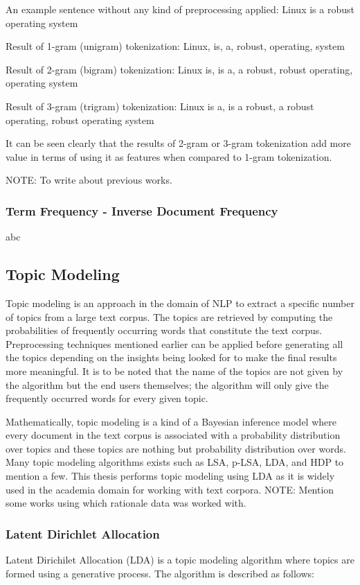 \documentclass[a4paper,12pt,twoside]{report}
\begin{document}
An example sentence without any kind of preprocessing applied: Linux is a robust operating system

Result of 1-gram (unigram) tokenization: Linux, is, a, robust, operating, system 

Result of 2-gram (bigram) tokenization: Linux is, is a, a robust, robust operating, operating system

Result of 3-gram (trigram) tokenization: Linux is a, is a robust, a robust operating, robust operating system

It can be seen clearly that the results of 2-gram or 3-gram tokenization add more value in terms of using it as features when compared to 1-gram tokenization.

NOTE: To write about previous works. 

\subsubsection{Term Frequency - Inverse Document Frequency}
abc

\subsection{Topic Modeling}
Topic modeling is an approach in the domain of NLP to extract a specific number of topics from a large text corpus. The topics are retrieved by computing the probabilities of frequently occurring words that constitute the text corpus. Preprocessing techniques mentioned earlier can be applied before generating all the topics depending on the insights being looked for to make the final results more meaningful. It is to be noted that the name of the topics are not given by the algorithm but the end users themselves; the algorithm will only give the frequently occurred words for every given topic.

Mathematically, topic modeling is a kind of a Bayesian inference model where every document in the text corpus is associated with a probability distribution over topics and these topics are nothing but probability distribution over words. Many topic modeling algorithms exists such as LSA, p-LSA, LDA, and HDP to mention a few. This thesis performs topic modeling using LDA as it is widely used in the academia domain for working with text corpora. NOTE: Mention some works using which rationale data was worked with.

\subsubsection{Latent Dirichlet Allocation}
Latent Dirichilet Allocation (LDA) is a topic modeling algorithm where topics are formed using a generative process. The algorithm is described as follows:
\end{document}
